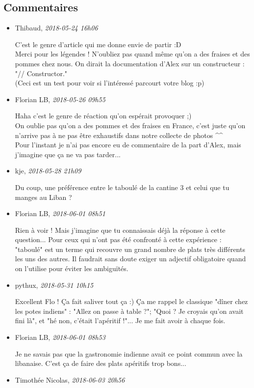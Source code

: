 \hypertarget{commentaires}{%
\subsection{Commentaires}\label{commentaires}}

\begin{itemize}
\item
  Thibaud, \emph{2018-05-24 16h06}

  C'est le genre d'article qui me donne envie de partir :D\\
  Merci pour les légendes ! N'oubliez pas quand même qu'on a des fraises
  et des pommes chez nous. On dirait la documentation d'Alex sur un
  constructeur : "// Constructor."\\
  (Ceci est un test pour voir si l'intéressé parcourt votre blog :p)
\item
  Florian LB, \emph{2018-05-26 09h55}

  Haha c'est le genre de réaction qu'on espérait provoquer ;)\\
  On oublie pas qu'on a des pommes et des fraises en France, c'est juste
  qu'on n'arrive pas à ne pas être exhaustifs dans notre collecte de
  photos \^{}\^{}\\
  Pour l'instant je n'ai pas encore eu de commentaire de la part d'Alex,
  mais j'imagine que ça ne va pas tarder...
\item
  kje, \emph{2018-05-28 21h09}

  Du coup, une préférence entre le taboulé de la cantine 3 et celui que
  tu manges au Liban ?
\item
  Florian LB, \emph{2018-06-01 08h51}

  Rien à voir ! Mais j'imagine que tu connaissais déjà la réponse à
  cette question... Pour ceux qui n'ont pas été confronté à cette
  expérience : "taboulé" est un terme qui recouvre un grand nombre de
  plats très différents les uns des autres. Il faudrait sans doute
  exiger un adjectif obligatoire quand on l'utilise pour éviter les
  ambiguïtés.
\item
  pythux, \emph{2018-05-31 10h15}

  Excellent Flo ! Ça fait saliver tout ça :) Ça me rappel le classique
  "dîner chez les potes indiens" : "Allez on passe à table ?"; "Quoi ?
  Je croyais qu'on avait fini là", et "hé non, c'était l'apéritif !"...
  Je me fait avoir à chaque fois.
\item
  Florian LB, \emph{2018-06-01 08h53}

  Je ne savais pas que la gastronomie indienne avait ce point commun
  avec la libanaise. C'est ça de faire des plats apéritifs trop bons...
\item
  Timothée Nicolas, \emph{2018-06-03 20h56}


\end{itemize}
